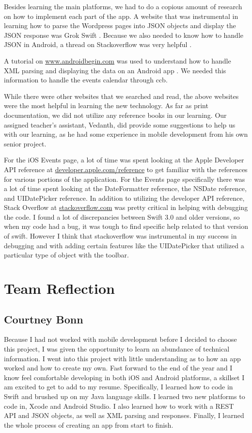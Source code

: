 \documentclass[letterpaper,10pt,draftclsnofoot,onecolumn,titlepage]{IEEEtran}
\begin{document}
Besides learning the main platforms, we had to do a copious amount of research on how to implement each part of the app.
A website that was instrumental in learning how to parse the Wordpress pages into JSON objects and display the JSON response was Grok Swift \cite{JSONSwift}. Because we also needed to know how to handle JSON in Android, a thread on Stackoverflow was very helpful \cite{JSONAndroid}.

A tutorial on \url{www.androidbegin.com} was used to understand how to handle XML parsing and displaying the data on an Android app \cite{XMLAndroid}.
We needed this information to handle the events calendar through \gls{ccb}.

While there were other websites that we searched and read, the above websites were the most helpful in learning the new technology.
As far as print documentation, we did not utilize any reference books in our learning.
Our assigned teacher's assistant, Vedanth, did provide some suggestions to help us with our learning, as he had some experience in mobile development from his own senior project.

For the iOS Events page, a lot of time was spent looking at the Apple Developer API reference at \url{developer.apple.com/reference} to get familiar with the references for various portions of the application.
For the Events page specifically there was a lot of time spent looking at the DateFormatter reference, the NSDate reference, and UIDatePicker reference.
In addition to utilizing the developer API reference, Stack Overflow at \url{stackoverflow.com} was pretty critical in helping with debugging the code.
I found a lot of discrepancies between Swift 3.0 and older versions, so when my code had a bug, it was tough to find specific help related to that version of swift.
However I think that stackoverflow was instrumental in my success in debugging and with adding certain features like the UIDatePicker that utilized a particular type of object with the toolbar.

\section{Team Reflection}

	\subsection{Courtney Bonn}

		Because I had not worked with mobile development before I decided to choose this project, I was given the opportunity to learn an abundance of technical information.
		I went into this project with little understanding as to how an app worked and how to create my own.
		Fast forward to the end of the year and I know feel comfortable developing in both iOS and Android platforms, a skillset I am excited to get to add to my resume.
		Specifically, I learned how to code in Swift and brushed up on my Java language skills.
		I learned two new platforms to code in, Xcode and Android Studio.
		I also learned how to work with a REST API and JSON objects, as well as XML parsing and responses.
		Finally, I learned the whole process of creating an app from start to finish.
\end{document}
